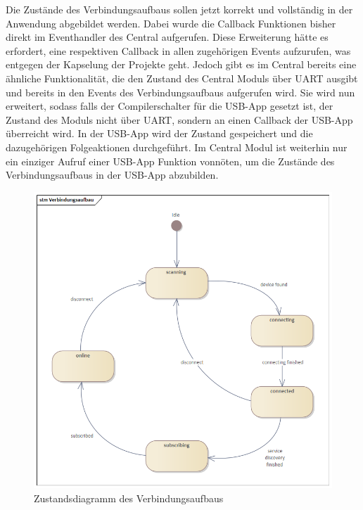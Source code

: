 Die Zustände des Verbindungsaufbaus sollen jetzt korrekt und vollständig in der Anwendung abgebildet werden. Dabei wurde die Callback Funktionen bisher direkt im Eventhandler des Central aufgerufen. Diese Erweiterung hätte es erfordert, eine respektiven Callback in allen zugehörigen Events aufzurufen, was entgegen der Kapselung der Projekte geht. Jedoch gibt es im Central bereits eine ähnliche Funktionalität, die den Zustand des Central Moduls über \ac{UART} ausgibt und bereits in den Events des Verbindungsaufbaus aufgerufen wird. Sie wird nun erweitert, sodass falls der Compilerschalter für die \ac{USB}-App gesetzt ist, der Zustand des Moduls nicht über \ac{UART}, sondern an einen Callback der \ac{USB}-App überreicht wird. In der \ac{USB}-App wird der Zustand gespeichert und die dazugehörigen Folgeaktionen durchgeführt. Im Central Modul ist weiterhin nur ein einziger Aufruf einer \ac{USB}-App Funktion vonnöten, um die Zustände des Verbindungsaufbaus in der \ac{USB}-App abzubilden.

\begin{figure}[H] 
	\centering
	\includegraphics[width=\textwidth]{figures/Verbindungsaufbau.png}
	\caption{Zustandsdiagramm des Verbindungsaufbaus}
\end{figure}




